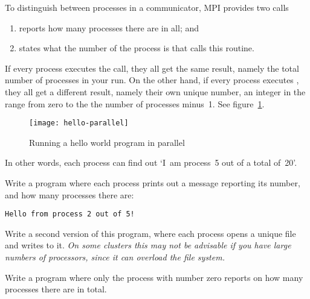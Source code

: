 To distinguish between processes in a communicator, MPI provides two calls
\begin{enumerate}
\item {} reports how many processes there are in all; and
\item {} states what the number of the
  process is that calls this routine.
\end{enumerate}

If every process executes the  call, they all get the
same result, namely the total number of processes in your run.
%
%
On the
other hand, if every process executes , they all get
a different result, namely their own unique number, an integer in the
range from zero to the the number of processes minus~1.
See figure~\ref{fig:rank-parallel}.
%
%
\begin{figure}[ht]
  \texttt{[image: hello-parallel]}
  \caption{Running a hello world program in parallel}
  \label{fig:rank-parallel}
\end{figure}
%
In other words, each process can find out `I~am process~5
out of a total of~20'.

\begin{exercise}
  \label{ex:hello3}
  Write a program where each process prints out a message
  reporting its number, and how many processes there are:
\begin{verbatim}
Hello from process 2 out of 5!
\end{verbatim}

  Write a second version of this program, where each process opens a
  unique file and writes to it. \emph{On some clusters this may not be
    advisable if you have large numbers of processors, since it can
    overload the file system.}
\end{exercise}

\begin{exercise}
  \label{ex:hello4}
  Write a program where only the process with number zero
  reports on how many processes there are in total.
\end{exercise}
